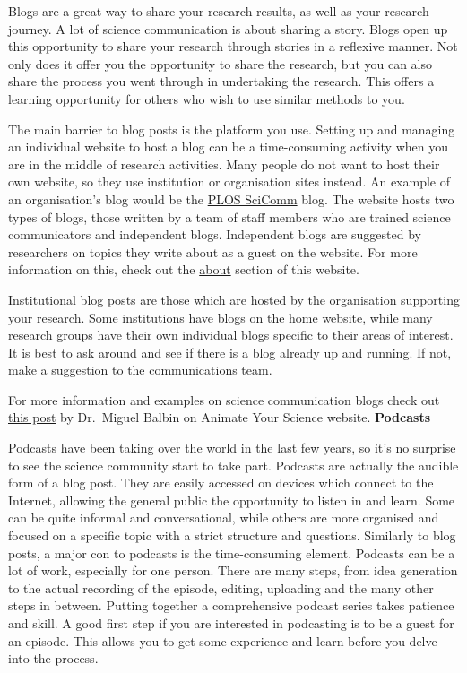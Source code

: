 \documentclass[
]{book}
\begin{document}
Blogs are a great way to share your research results, as well as your research journey. A lot of science communication is about sharing a story. Blogs open up this opportunity to share your research through stories in a reflexive manner. Not only does it offer you the opportunity to share the research, but you can also share the process you went through in undertaking the research. This offers a learning opportunity for others who wish to use similar methods to you.

The main barrier to blog posts is the platform you use. Setting up and managing an individual website to host a blog can be a time-consuming activity when you are in the middle of research activities. Many people do not want to host their own website, so they use institution or organisation sites instead. An example of an organisation's blog would be the \href{https://scicomm.plos.org/}{PLOS SciComm} blog. The website hosts two types of blogs, those written by a team of staff members who are trained science communicators and independent blogs. Independent blogs are suggested by researchers on topics they write about as a guest on the website. For more information on this, check out the \href{https://plos.org/blogs/about/}{about} section of this website.

Institutional blog posts are those which are hosted by the organisation supporting your research. Some institutions have blogs on the home website, while many research groups have their own individual blogs specific to their areas of interest. It is best to ask around and see if there is a blog already up and running. If not, make a suggestion to the communications team.

For more information and examples on science communication blogs check out \href{https://www.animateyour.science/post/top-5-science-communication-blogs}{this post} by Dr.~Miguel Balbin on Animate Your Science website. \textbf{Podcasts}

Podcasts have been taking over the world in the last few years, so it's no surprise to see the science community start to take part. Podcasts are actually the audible form of a blog post. They are easily accessed on devices which connect to the Internet, allowing the general public the opportunity to listen in and learn. Some can be quite informal and conversational, while others are more organised and focused on a specific topic with a strict structure and questions. Similarly to blog posts, a major con to podcasts is the time-consuming element. Podcasts can be a lot of work, especially for one person. There are many steps, from idea generation to the actual recording of the episode, editing, uploading and the many other steps in between. Putting together a comprehensive podcast series takes patience and skill. A good first step if you are interested in podcasting is to be a guest for an episode. This allows you to get some experience and learn before you delve into the process.
\end{document}
